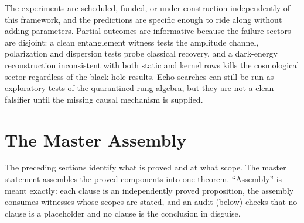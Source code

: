 \documentclass[11pt,letterpaper]{article}
\theoremstyle{definition}
\begin{document}
The experiments are scheduled, funded, or under construction
independently of this framework, and the predictions are specific
enough to ride along without adding parameters.  Partial outcomes are
informative because the failure sectors are disjoint: a clean
entanglement witness tests the amplitude channel, polarization and
dispersion tests probe classical recovery, and a dark-energy
reconstruction inconsistent with both static and kernel rows kills the
cosmological sector regardless of the black-hole results.  Echo
searches can still be run as exploratory tests of the quarantined rung
algebra, but they are not a clean falsifier until the missing causal
mechanism is supplied.

\section{The Master Assembly}
\label{sec:master}

The preceding sections identify what is proved and at what scope.  The
master statement assembles the proved components into one theorem.
``Assembly'' is meant exactly: each clause is an independently proved
proposition, the assembly consumes witnesses whose scopes are stated,
and an audit (below) checks that no clause is a placeholder and no
clause is the conclusion in disguise.
\end{document}
